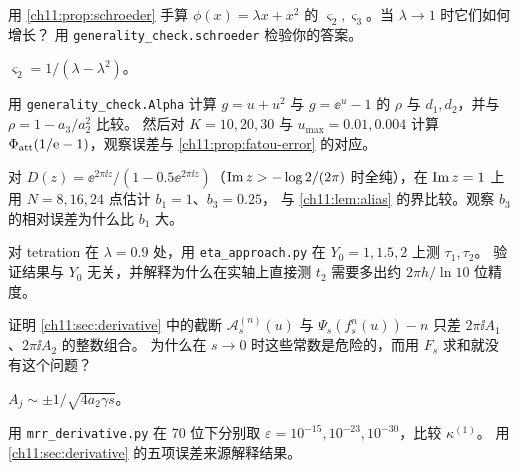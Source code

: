 \exercises

\begin{exercise}\label{ch11:ex:schroeder}
用 \cref{ch11:prop:schroeder} 手算 $\phi(x)=\lambda x+x^2$ 的 $\varsigma_2,\varsigma_3$。当 $\lambda\to1$ 时它们如何增长？
用 \texttt{generality\_\allowbreak{}check.schroeder} 检验你的答案。
\begin{hint}$\varsigma_2=1/(\lambda-\lambda^2)$。\end{hint}
\end{exercise}

\begin{exercise}\label{ch11:ex:alpha}
用 \texttt{generality\_\allowbreak{}check.Alpha} 计算 $g=u+u^2$ 与 $g=\ee^u-1$ 的 $\rho$ 与 $d_1,d_2$，并与 $\rho=1-a_3/a_2^2$ 比较。
然后对 $K=10,20,30$ 与 $u_{\max}=0.01,0.004$ 计算 $\Phi_{\mathrm{att}}(1/\mathrm{e}-1)$，观察误差与 \cref{ch11:prop:fatou-error} 的对应。
\end{exercise}

\begin{exercise}\label{ch11:ex:alias}
对 $D(z)=\ee^{2\pi\ii z}/(1-0.5\ee^{2\pi\ii z})$（$\operatorname{Im} z>-\log2/(2\pi)$ 时全纯），在 $\operatorname{Im} z=1$ 上用 $N=8,16,24$ 点估计 $b_1=1$、$b_3=0.25$，
与 \cref{ch11:lem:alias} 的界比较。观察 $b_3$ 的相对误差为什么比 $b_1$ 大。
\end{exercise}

\begin{exercise}\label{ch11:ex:line}
对 tetration 在 $\lambda=0.9$ 处，用 \texttt{eta\_\allowbreak{}approach.py} 在 $Y_0=1,1.5,2$ 上测 $\tau_1,\tau_2$。
验证结果与 $Y_0$ 无关，并解释为什么在实轴上直接测 $t_2$ 需要多出约 $2\pi h/\ln10$ 位精度。
\end{exercise}

\begin{exercise}\label{ch11:ex:telescoping}
证明 \cref{ch11:sec:derivative} 中的截断 $\mathcal A^{(n)}_s(u)$ 与 $\Psi_s(f_s^n(u))-n$ 只差 $2\pi\ii A_1$、$2\pi\ii A_2$ 的整数组合。
为什么在 $s\to0$ 时这些常数是危险的，而用 $F_s$ 求和就没有这个问题？
\begin{hint}$A_j\sim\pm1/\sqrt{4a_2\gamma s}$。\end{hint}
\end{exercise}

\begin{exercise}\label{ch11:ex:central}
用 \texttt{mrr\_\allowbreak{}derivative.py} 在 70 位下分别取 $\varepsilon=10^{-15},10^{-23},10^{-30}$，比较 $\kappa^{(1)}$。
用 \cref{ch11:sec:derivative} 的五项误差来源解释结果。
\end{exercise}

